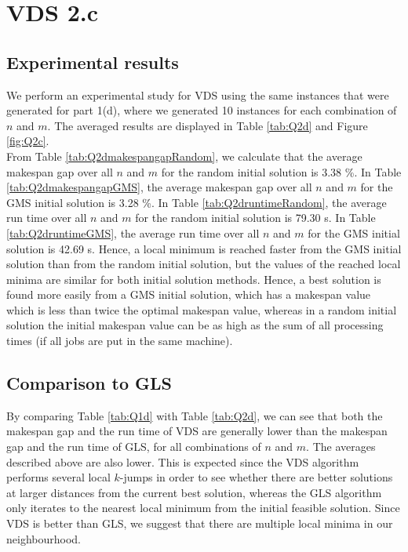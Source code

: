 \documentclass[12pt,a4paper,reqno]{article}
\begin{document}
\section*{VDS 2.c}
\subsection*{Experimental results}
We perform an experimental study for VDS using the same instances that were generated for part 1(d), where we generated 10 instances for each combination of $n$ and $m$. The averaged results are displayed in Table \ref{tab:Q2d} and Figure \ref{fig:Q2c}. \\

From Table \ref{tab:Q2dmakespangapRandom}, we calculate that the average makespan gap over all $n$ and $m$ for the random initial solution is 3.38 \%. In Table \ref{tab:Q2dmakespangapGMS}, the average makespan gap over all $n$ and $m$ for the GMS initial solution is 3.28 \%. In Table \ref{tab:Q2druntimeRandom}, the average run time over all $n$ and $m$ for the random initial solution is 79.30 s. In Table \ref{tab:Q2druntimeGMS}, the average run time over all $n$ and $m$ for the GMS initial solution is 42.69 s. Hence, a local minimum is reached faster from the GMS initial solution than from the random initial solution, but the values of the reached local minima are similar for both initial solution methods. Hence, a best solution is found more easily from a GMS initial solution, which has a makespan value which is less than twice the optimal makespan value, whereas in a random initial solution the initial makespan value can be as high as the sum of all processing times (if all jobs are put in the same machine). 

\subsection*{Comparison to GLS}
By comparing Table \ref{tab:Q1d} with Table \ref{tab:Q2d}, we can see that both the makespan gap and the run time of VDS are generally lower than the makespan gap and the run time of GLS, for all combinations of $n$ and $m$. The averages described above are also lower. This is expected since the VDS algorithm performs several local $k$-jumps in order to see whether there are better solutions at larger distances from the current best solution, whereas the GLS algorithm only iterates to the nearest local minimum from the initial feasible solution. Since VDS is better than GLS, we suggest that there are multiple local minima in our neighbourhood. \\
\end{document}
